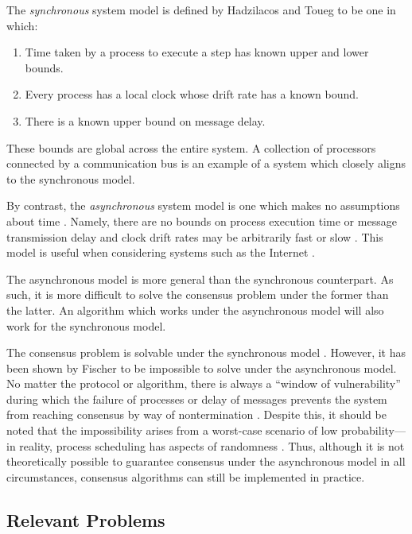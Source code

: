 \documentclass[12pt, a4paper]{article}
\begin{document}
The \textit{synchronous} system model is defined by Hadzilacos and Toueg
\cite{hadzilacos1994modular} to be one in which:

\begin{enumerate}
  \item Time taken by a process to execute a step has known upper and lower
    bounds.
  \item Every process has a local clock whose drift rate has a known bound.
  \item There is a known upper bound on message delay.
\end{enumerate}

These bounds are global across the entire system. A collection of processors
connected by a communication bus is an example of a system which closely aligns
to the synchronous model.

By contrast, the \textit{asynchronous} system model is one which makes no
assumptions about time \cite{coulouris2005distributed, hadzilacos1994modular}.
Namely, there are no bounds on process execution time or message transmission
delay and clock drift rates may be arbitrarily fast or slow
\cite{coulouris2005distributed}. This model is useful when considering systems
such as the Internet \cite{coulouris2005distributed}.

The asynchronous model is more general than the synchronous counterpart. As
such, it is more difficult to solve the consensus problem under the former than
the latter. An algorithm which works under the asynchronous model will also work
for the synchronous model.

The consensus problem is solvable under the synchronous model
\cite{fischer1985impossibility, kshemkalyani_singhal_2008}. However, it has been
shown by Fischer \cite{fischer1985impossibility} to be impossible to solve under
the asynchronous model. No matter the protocol or algorithm, there is always a
``window of vulnerability'' during which the failure of processes or delay of
messages prevents the system from reaching consensus by way of nontermination
\cite{fischer1985impossibility}. Despite this, it should be noted that the
impossibility arises from a worst-case scenario of low probability---in reality,
process scheduling has aspects of randomness \cite{aguilera2010stumbling}. Thus,
although it is not theoretically possible to guarantee consensus under the
asynchronous model in all circumstances, consensus algorithms can still be
implemented in practice.


\subsection{Relevant Problems} \label{sec:relevant-problems}
\end{document}
